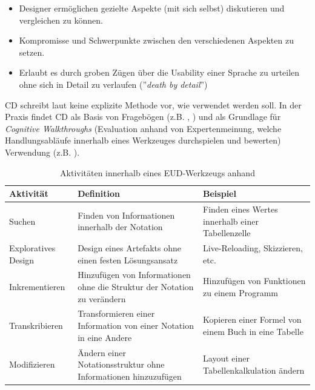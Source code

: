 \begin{itemize}
    \item Designer ermöglichen gezielte Aspekte (mit sich selbst) diskutieren und vergleichen zu können.
    \item Kompromisse und Schwerpunkte zwischen den verschiedenen Aspekten zu setzen.
    \item Erlaubt es durch groben Zügen über die Usability einer Sprache zu urteilen ohne sich in Detail zu verlaufen (''\textit{death by detail}'')
\end{itemize}

\ac{CD} schreibt laut \cite{blackwell2003notational} keine explizite Methode vor, wie verwendet werden soll. In der Praxis findet \ac{CD} als Basis von Fragebögen (z.B. \cite{EBobkowska.2003}, \cite{Wijayarathna.}) und als Grundlage für \textit{Cognitive Walkthroughs} (Evaluation anhand von Expertenmeinung, welche Handlungsabläufe innerhalb eines Werkzeuges durchspielen und bewerten) Verwendung (z.B. \cite{blackwell2000cognitive}). 

\begin{table}[h]
\centering
\begin{tabularx}{\textwidth}{lXX}
\hline
\rowcolor[HTML]{EFEFEF} 
Aktivität           & Definition                                                               & Beispiel\\ \hline
Suchen              & Finden von Informationen innerhalb der Notation                          & Finden eines Wertes innerhalb einer Tabellenzelle\\ \hline
Exploratives Design & Design eines Artefakts ohne einen festen Lösungsansatz                   & Live-Reloading, Skizzieren, etc.\\ \hline
Inkrementieren      & Hinzufügen von Informationen ohne die Struktur der Notation zu verändern & Hinzufügen von Funktionen zu einem Programm\\ \hline
Transkribieren      & Transformieren einer Information von einer Notation in eine Andere       & Kopieren einer Formel von einem Buch in eine Tabelle\\ \hline
Modifizieren        & Ändern einer Notationsstruktur ohne Informationen hinzuzufügen           & Layout einer Tabellenkalkulation ändern \\ \hline
\end{tabularx}
\caption{Aktivitäten innerhalb eines \ac{EUD}-Werkzeugs anhand \cite{green2000instructions}}
\label{tab:cogaktivitaeten}
\end{table}

